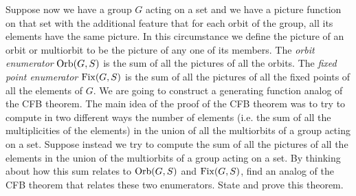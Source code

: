 \iteme   Suppose now we have a  group $G$ acting on a set and we have a picture
function on that set with the additional feature that for each orbit of the
group, all its elements have the same picture. In this circumstance we define
the
picture of an orbit or multiorbit to be the picture of any one of its members. The
{\em orbit
enumerator} ${\rm Orb}(G,S)$ is the sum of all the pictures
of all the orbits.  The
{\em fixed point enumerator} ${\rm Fix}(G,S)$ is
the sum of all the pictures of all
the fixed points of all the elements of $G$.  We are going to construct a
generating function analog of the CFB theorem. The main idea of the proof of
the
CFB theorem was to try to compute in two different ways the number of elements
(i.e. the sum of all the multiplicities of the elements) in the union of all
the
multiorbits of a group acting on a set.  Suppose instead we try to compute the
sum of all the pictures of all the elements in the union of the multiorbits of
a
group acting on a set.  By thinking about how this sum relates to ${\rm Orb}(G,S)$
and
${\rm Fix}(G,S)$, find an analog of the CFB theorem that relates these two
enumerators. 
State and prove this theorem.\label{Orbit-FixedPoint}


